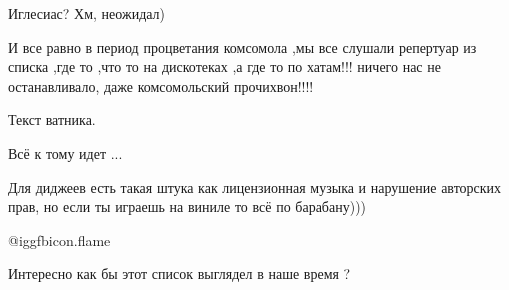\begin{itemize}
Иглесиас? Хм, неожидал)

 

И все равно в период процветания комсомола ,мы все слушали репертуар из списка
,где то ,что то на дискотеках ,а где то по хатам!!! ничего нас не
останавливало, даже комсомольский прочихвон!!!!


 
Текст ватника.

 
Всё к тому идет ...

 
Для диджеев есть такая штука как лицензионная музыка и нарушение авторских прав, но если ты играешь на виниле то всё по барабану)))

 
@igg{fbicon.flame}

 
Интересно как бы этот список выглядел в наше время ?

 

\end{itemize}
